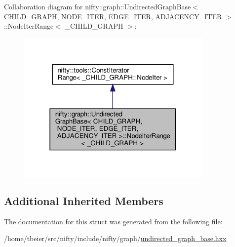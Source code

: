 Collaboration diagram for nifty\+:\+:graph\+:\+:Undirected\+Graph\+Base$<$ C\+H\+I\+L\+D\+\_\+\+G\+R\+A\+PH, N\+O\+D\+E\+\_\+\+I\+T\+ER, E\+D\+G\+E\+\_\+\+I\+T\+ER, A\+D\+J\+A\+C\+E\+N\+C\+Y\+\_\+\+I\+T\+ER $>$\+:\+:Node\+Iter\+Range$<$ \+\_\+\+C\+H\+I\+L\+D\+\_\+\+G\+R\+A\+PH $>$\+:
\nopagebreak
\begin{figure}[H]
\begin{center}
\leavevmode
\includegraphics[width=271pt]{structnifty_1_1graph_1_1UndirectedGraphBase_1_1NodeIterRange__coll__graph}
\end{center}
\end{figure}
\subsection*{Additional Inherited Members}


The documentation for this struct was generated from the following file\+:\begin{DoxyCompactItemize}
\item 
/home/tbeier/src/nifty/include/nifty/graph/\hyperlink{undirected__graph__base_8hxx}{undirected\+\_\+graph\+\_\+base.\+hxx}\end{DoxyCompactItemize}
